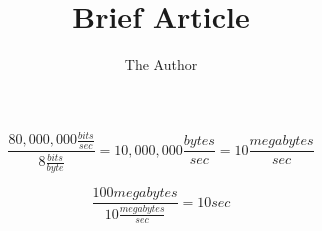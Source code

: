 \documentclass[11pt]{article}
\title{Brief Article}
\author{The Author}
\begin{document}
\maketitle

\[
\frac{80,000,000 \frac{\mathit bits}{\mathit sec}}{8 \frac{\mathit bits}{\mathit byte}} = 10,000,000 \frac{\mathit bytes}{\mathit sec} = 10 \frac{\mathit megabytes}{\mathit sec}
\]

\[
\frac{100 \mathit megabytes}{10 \frac{\mathit megabytes}{\mathit sec}} = 10 \mathit sec
\]


 
\end{document}
